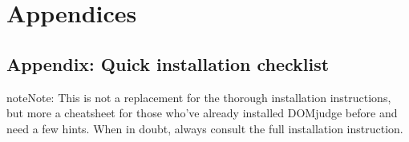 \documentclass[a4paper,10pt,english,openany]{sphinxmanual}
\begin{document}
\section{Appendices}
\label{\detokenize{index:appendices}}
\sphinxstepscope


\subsection{Appendix: Quick installation checklist}
\label{\detokenize{quick-install:appendix-quick-installation-checklist}}\label{\detokenize{quick-install::doc}}
\begin{sphinxadmonition}{note}{Note:}
\sphinxAtStartPar
This is not a replacement for the thorough installation
instructions, but more a cheat\sphinxhyphen{}sheet for those who’ve already
installed DOMjudge before and need a few hints. When in doubt, always
consult the full installation instruction.
\end{sphinxadmonition}
\end{document}
